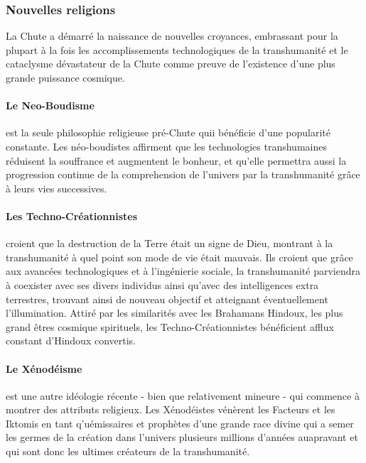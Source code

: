 \subsubsection{Nouvelles religions} \label{sec:new-religions} 

La Chute a démarré la naissance de nouvelles croyances, embrassant pour la plupart à la fois les accomplissements technologiques de la transhumanité et le cataclysme dévastateur de la Chute comme preuve de l'existence d'une plus grande puissance cosmique. 

\paragraph {Le Neo-Boudisme} \label{sec:neo-buddhism} est la seule philosophie religieuse pré-Chute quii bénéficie d'une popularité constante. Les néo-boudistes affirment que les technologies transhumaines réduisent la souffrance et augmentent le bonheur, et qu'elle permettra aussi la progression continue de la comprehension de l'univers par la transhumanité grâce à leurs vies successives. 

\paragraph {Les Techno-Créationnistes} \label{sec:techno-creationists} croient que la destruction de la Terre était un signe de Dieu, montrant à la transhumanité à quel point son mode de vie était mauvais. Ils croient que grâce aux avancées technologiques et à l'ingénierie sociale, la transhumanité parviendra à coexister avec ses divers individus ainsi qu'avec des intelligences extra terrestres, trouvant ainsi de nouveau objectif et atteignant éventuellement l'illumination. Attiré par les similarités avec les Brahamans Hindoux, les plus grand êtres cosmique spirituels, les Techno-Créationnistes bénéficient afflux constant d'Hindoux convertis. 

\paragraph {Le Xénodéisme} \label{sec:xenodeism} est une autre idéologie récente - bien que relativement mineure - qui commence à montrer des attributs religieux. Les Xénodéistes vénèrent les Facteurs et les Iktomis en tant q'uémissaires et prophètes d'une grande race divine qui a semer les germes de la création dans l'univers plusieurs millions d'années auapravant et qui sont donc les ultimes créateurs de la transhumanité. 

